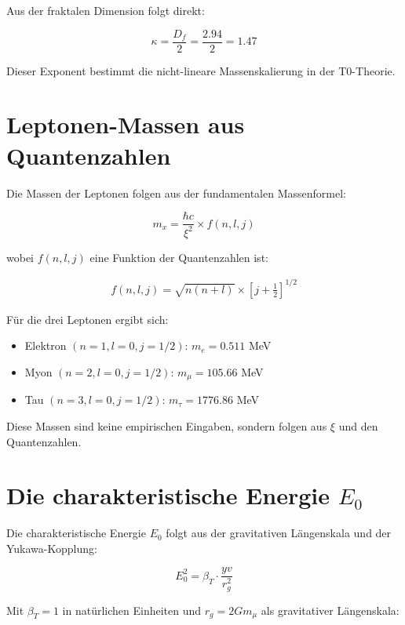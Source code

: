 \documentclass[12pt,a4paper]{article}
\theoremstyle{definition}
\begin{document}
	Aus der fraktalen Dimension folgt direkt:
	
	\begin{equation}
		\kappa = \frac{D_f}{2} = \frac{2.94}{2} = 1.47
	\end{equation}
	
	Dieser Exponent bestimmt die nicht-lineare Massenskalierung in der T0-Theorie.
	
	\section{Leptonen-Massen aus Quantenzahlen}
	
	Die Massen der Leptonen folgen aus der fundamentalen Massenformel:
	
	\begin{equation}
		m_x = \frac{\hbar c}{\xi^2} \times f(n, l, j)
	\end{equation}
	
	wobei $f(n, l, j)$ eine Funktion der Quantenzahlen ist:
	
	\begin{align}
		f(n, l, j) = \sqrt{n(n+l)} \times \left[j + \frac{1}{2}\right]^{1/2}
	\end{align}
	
	F\"ur die drei Leptonen ergibt sich:
	
	\begin{itemize}
		\item Elektron $(n=1, l=0, j=1/2)$: $m_e = 0.511$ MeV
		\item Myon $(n=2, l=0, j=1/2)$: $m_\mu = 105.66$ MeV
		\item Tau $(n=3, l=0, j=1/2)$: $m_\tau = 1776.86$ MeV
	\end{itemize}
	
	Diese Massen sind keine empirischen Eingaben, sondern folgen aus $\xi$ und den Quantenzahlen.
	
	\section{Die charakteristische Energie $E_0$}
	
	Die charakteristische Energie $E_0$ folgt aus der gravitativen L\"angenskala und der Yukawa-Kopplung:
	
	\begin{equation}
		E_0^2 = \beta_T \cdot \frac{yv}{r_g^2}
	\end{equation}
	
	Mit $\beta_T = 1$ in nat\"urlichen Einheiten und $r_g = 2Gm_\mu$ als gravitativer L\"angenskala:
	
\end{document}
